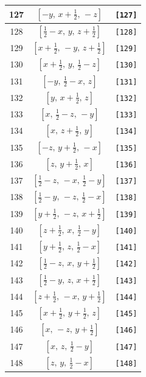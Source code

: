 \documentclass[fleqn,8pt]{jsarticle}
\begin{document}
\begin{longtable}{ccc}
127 & $\left[ - y,\, x + \frac{1}{2},\, - z \right]$ & {\tt [127]} \\ \hline
128 & $\left[ \frac{1}{2} - x,\, y,\, z + \frac{1}{2} \right]$ & {\tt [128]} \\ \hline
129 & $\left[ x + \frac{1}{2},\, - y,\, z + \frac{1}{2} \right]$ & {\tt [129]} \\ \hline
130 & $\left[ x + \frac{1}{2},\, y,\, \frac{1}{2} - z \right]$ & {\tt [130]} \\ \hline
131 & $\left[ - y,\, \frac{1}{2} - x,\, z \right]$ & {\tt [131]} \\ \hline
132 & $\left[ y,\, x + \frac{1}{2},\, z \right]$ & {\tt [132]} \\ \hline
133 & $\left[ x,\, \frac{1}{2} - z,\, - y \right]$ & {\tt [133]} \\ \hline
134 & $\left[ x,\, z + \frac{1}{2},\, y \right]$ & {\tt [134]} \\ \hline
135 & $\left[ - z,\, y + \frac{1}{2},\, - x \right]$ & {\tt [135]} \\ \hline
136 & $\left[ z,\, y + \frac{1}{2},\, x \right]$ & {\tt [136]} \\ \hline
137 & $\left[ \frac{1}{2} - z,\, - x,\, \frac{1}{2} - y \right]$ & {\tt [137]} \\ \hline
138 & $\left[ \frac{1}{2} - y,\, - z,\, \frac{1}{2} - x \right]$ & {\tt [138]} \\ \hline
139 & $\left[ y + \frac{1}{2},\, - z,\, x + \frac{1}{2} \right]$ & {\tt [139]} \\ \hline
140 & $\left[ z + \frac{1}{2},\, x,\, \frac{1}{2} - y \right]$ & {\tt [140]} \\ \hline
141 & $\left[ y + \frac{1}{2},\, z,\, \frac{1}{2} - x \right]$ & {\tt [141]} \\ \hline
142 & $\left[ \frac{1}{2} - z,\, x,\, y + \frac{1}{2} \right]$ & {\tt [142]} \\ \hline
143 & $\left[ \frac{1}{2} - y,\, z,\, x + \frac{1}{2} \right]$ & {\tt [143]} \\ \hline
144 & $\left[ z + \frac{1}{2},\, - x,\, y + \frac{1}{2} \right]$ & {\tt [144]} \\ \hline
145 & $\left[ x + \frac{1}{2},\, y + \frac{1}{2},\, z \right]$ & {\tt [145]} \\ \hline
146 & $\left[ x,\, - z,\, y + \frac{1}{2} \right]$ & {\tt [146]} \\ \hline
147 & $\left[ x,\, z,\, \frac{1}{2} - y \right]$ & {\tt [147]} \\ \hline
148 & $\left[ z,\, y,\, \frac{1}{2} - x \right]$ & {\tt [148]} \\ \hline

\end{longtable}
\end{document}
